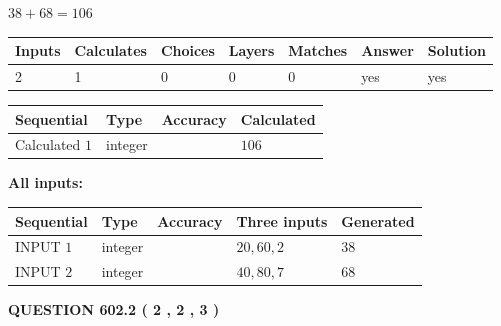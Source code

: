\documentclass[12pt]{article}
\begin{document}
 

$ %
38 +  %
68=   %
106$
 
 
\noindent{}
 
 

 
   
   
   
   
\noindent\begin{tabular}{|l|l|l|l|l|l|l|}
 \hline
Inputs & Calculates & Choices & Layers & Matches & Answer & Solution \\ \hline
 2  & 
 1  & 
 0
  & 
 0  & 
 0  & 
  yes & 
  yes 
  \\ \hline
 \end{tabular}
   
   
   
   
\noindent{}
   
   
  
  
\noindent\begin{tabular}{|l|l|l|l|}
\hline
 Sequential & Type & Accuracy & Calculated \\ 
\hline
 
 
  Calculated $  1 $ & integer &  & 
  $ 106 $ 
 \\  \hline  
 \end{tabular}
   
   
   
   
\noindent\vspace{0.1in}\hspace{-0.08in} {\textbf{\Large{All inputs: }}}
   
   
  
  
\noindent\begin{tabular}{|l|l|l|l|l|}
\hline
 Sequential & Type & Accuracy & Three inputs & Generated \\ 
\hline
 
 
  INPUT $  1 $ & integer &  & $
 20
 , 
 60
 , 
 2
 $ & $ 38 $ 
 \\  \hline  
 
 
  INPUT $  2 $ & integer &  & $
 40
 , 
 80
 , 
 7
 $ & $ 68 $ 
 \\  \hline  
 \end{tabular}
   
   
  
\vspace{0.2in}
  
{\textbf{\Large{QUESTION
602.2 
 ( 2 , 2 , 3 )
}}}
  
\end{document}
